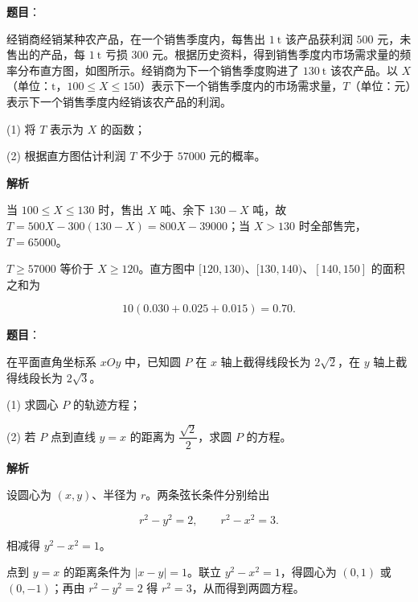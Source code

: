 \begin{answer}

\textbf{题目}：

经销商经销某种农产品，在一个销售季度内，每售出 $1\ \mathrm t$ 该产品获利润 $500$ 元，未售出的产品，每 $1\ \mathrm t$ 亏损 $300$ 元。根据历史资料，得到销售季度内市场需求量的频率分布直方图，如图所示。经销商为下一个销售季度购进了 $130\ \mathrm t$ 该农产品。以 $X$（单位：$\mathrm t$，$100\leqslant X\leqslant150$）表示下一个销售季度内的市场需求量，$T$（单位：元）表示下一个销售季度内经销该农产品的利润。
\nopagebreak[4]
\begin{center}\end{center}
\nopagebreak[4]
(1) 将 $T$ 表示为 $X$ 的函数；

(2) 根据直方图估计利润 $T$ 不少于 $57000$ 元的概率。

\textbf{解析}


当 $100\leqslant X\leqslant130$ 时，售出 $X$ 吨、余下 $130-X$ 吨，故 $T=500X-300(130-X)=800X-39000$；当 $X>130$ 时全部售完，$T=65000$。


$T\geqslant57000$ 等价于 $X\geqslant120$。直方图中 $[120,130)$、$[130,140)$、$[140,150]$ 的面积之和为

\nopagebreak[4]
\[10(0.030+0.025+0.015)=0.70.\]



\end{answer}
\begin{answer}

\textbf{题目}：

在平面直角坐标系 $xOy$ 中，已知圆 $P$ 在 $x$ 轴上截得线段长为 $2\sqrt2$，在 $y$ 轴上截得线段长为 $2\sqrt3$。

(1) 求圆心 $P$ 的轨迹方程；

(2) 若 $P$ 点到直线 $y=x$ 的距离为 $\dfrac{\sqrt2}{2}$，求圆 $P$ 的方程。

\textbf{解析}


设圆心为 $(x,y)$、半径为 $r$。两条弦长条件分别给出

\nopagebreak[4]
\[r^2-y^2=2,\qquad r^2-x^2=3.\]

相减得 $y^2-x^2=1$。


点到 $y=x$ 的距离条件为 $|x-y|=1$。联立 $y^2-x^2=1$，得圆心为 $(0,1)$ 或 $(0,-1)$；再由 $r^2-y^2=2$ 得 $r^2=3$，从而得到两圆方程。



\end{answer}
